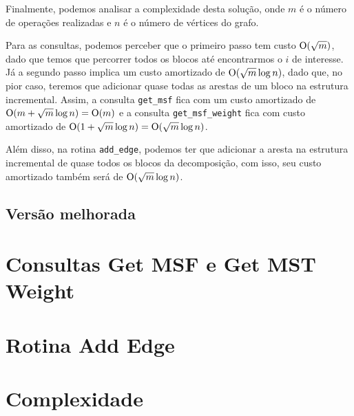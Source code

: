 Finalmente, podemos analisar a complexidade desta solução, onde $m$ é o número de operações realizadas e $n$ é o número de vértices do grafo.

Para as consultas, podemos perceber que o primeiro passo tem custo $\mathrm{O}(\sqrt m)$, dado que temos que percorrer todos os blocos até encontrarmos o $i$ de interesse. Já a segundo passo implica um custo amortizado de $\mathrm{O}(\sqrt m \log n)$, dado que, no pior caso, teremos que adicionar quase todas as arestas de um bloco na estrutura incremental. Assim, a consulta \texttt{get\_msf} fica com um custo amortizado de $\mathrm{O}(m + \sqrt m \log n) = \mathrm{O}(m)$ e a consulta \texttt{get\_msf\_weight} fica com custo amortizado de $\mathrm{O}(1 + \sqrt m \log n) = \mathrm{O}(\sqrt m \log n)$.

Além disso, na rotina \texttt{add\_edge}, podemos ter que adicionar a aresta na estrutura incremental de quase todos os blocos da decomposição, com isso, seu custo amortizado também será de $\mathrm{O}(\sqrt m \log n)$.

\subsection{Versão melhorada}
\label{sec:rmsf-versao-mel}


\section{Consultas Get MSF e Get MST Weight}
\label{sec:rmsf-get-msf}



\section{Rotina Add Edge}
\label{sec:rmsf-add-edge}



\section{Complexidade}
\label{sec:rmsf-complexidade}

